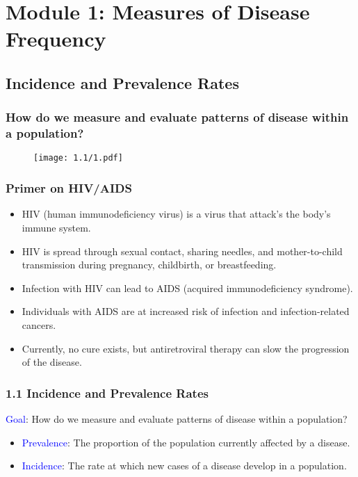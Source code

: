 \section{Module 1: Measures of Disease Frequency}
\subsection{Incidence and Prevalence Rates}
\subsubsection*{How do we measure and evaluate patterns of disease within a population?}
\begin{figure}[H]
    \centering
    \texttt{[image: 1.1/1.pdf]}
\end{figure}
\subsubsection*{Primer on HIV/AIDS}
\begin{itemize}
    \item HIV (human immunodeficiency virus) is a virus that attack's the body's immune
          system.
    \item HIV is spread through sexual contact, sharing needles, and mother-to-child
          transmission during pregnancy, childbirth, or breastfeeding.
    \item Infection with HIV can lead to AIDS (acquired immunodeficiency syndrome).
    \item Individuals with AIDS are at increased risk of infection and infection-related
          cancers.
    \item Currently, no cure exists, but antiretroviral therapy can slow the progression of the
          disease.
\end{itemize}
\subsubsection*{1.1 Incidence and Prevalence Rates}
\begin{Regular}
    \textcolor{Blue}{Goal}: How do we measure and evaluate patterns of disease within a population?
\end{Regular}
\begin{itemize}
    \item \textcolor{Blue}{Prevalence}: The proportion of the population currently affected by a disease.
    \item \textcolor{Blue}{Incidence}: The rate at which new cases of a disease develop in a population.
\end{itemize}
